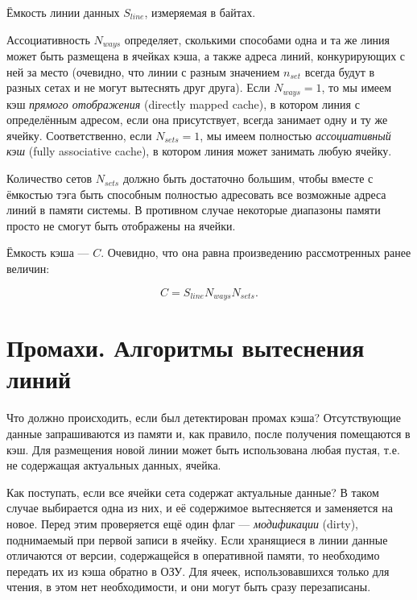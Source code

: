 \begin{itemize*}
\item Ёмкость линии данных $S_{line}$, измеряемая в байтах.
\item    Ассоциативность $N_{ways}$ определяет, сколькими способами одна и та же линия может быть размещена в ячейках кэша,  а также адреса линий, конкурирующих с ней за место (очевидно, что линии с разным значением $n_{set}$ всегда будут в разных сетах и не могут вытеснять друг друга). Если $N_{ways} = 1$, то мы имеем кэш \textit{прямого отображения} (\abbr directly mapped cache), в котором линия с определённым адресом, если она присутствует, всегда занимает одну и ту же ячейку. Соответственно, если $N_{sets} =1$, мы имеем полностью \textit{ассоциативный кэш} (\abbr fully associative cache), в котором линия может занимать любую ячейку.

\item    Количество сетов $N_{sets}$ должно быть достаточно большим, чтобы вместе с ёмкостью тэга быть способным полностью адресовать все возможные адреса линий в памяти системы. В противном случае некоторые диапазоны памяти просто не смогут быть отображены на ячейки.

\item    Ёмкость кэша — $C$. Очевидно, что она равна произведению рассмотренных ранее величин:

$$C = S_{line}N_{ways} N_{sets}.$$
\end{itemize*}


\section{Промахи. Алгоритмы вытеснения линий}

Что должно происходить, если был детектирован промах кэша? Отсутствующие данные запрашиваются из памяти и, как правило, после получения помещаются в кэш. Для размещения новой линии может быть использована любая пустая, т.е. не содержащая актуальных данных, ячейка.

Как поступать, если все ячейки сета содержат актуальные данные? В таком случае выбирается одна из них, и её содержимое вытесняется и заменяется на новое. Перед этим проверяется ещё один флаг — \textit{модификации} (\abbr dirty), поднимаемый при первой записи в ячейку. Если хранящиеся  в линии данные отличаются от версии, содержащейся в оперативной памяти, то необходимо передать их из кэша обратно в ОЗУ. Для ячеек, использовавшихся только для чтения, в этом нет необходимости, и они могут быть сразу перезаписаны.

